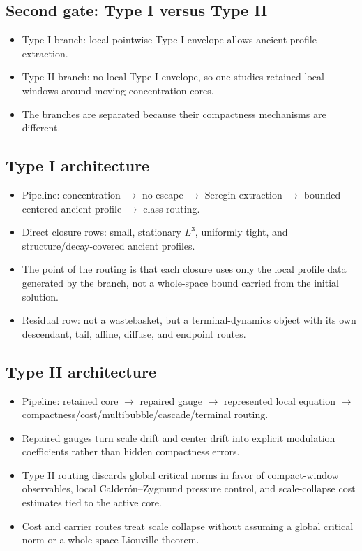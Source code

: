 \documentclass[11pt]{article}
\theoremstyle{plain}
\theoremstyle{definition}
\theoremstyle{remark}
\begin{document}
\subsection{Second gate: Type I versus Type II}
\begin{itemize}
  \item Type I branch: local pointwise Type I envelope allows ancient-profile extraction.
  \item Type II branch: no local Type I envelope, so one studies retained local windows around moving concentration cores.
  \item The branches are separated because their compactness mechanisms are different.
\end{itemize}

\subsection{Type I architecture}
\begin{itemize}
  \item Pipeline: concentration $\to$ no-escape $\to$ Seregin extraction $\to$ bounded centered ancient profile $\to$ class routing.
  \item Direct closure rows: small, stationary $L^3$, uniformly tight, and structure/decay-covered ancient profiles.
  \item The point of the routing is that each closure uses only the local profile data generated by the branch, not a whole-space bound carried from the initial solution.
  \item Residual row: not a wastebasket, but a terminal-dynamics object with its own descendant, tail, affine, diffuse, and endpoint routes.
\end{itemize}

\subsection{Type II architecture}
\begin{itemize}
  \item Pipeline: retained core $\to$ repaired gauge $\to$ represented local equation $\to$ compactness/cost/multibubble/cascade/terminal routing.
  \item Repaired gauges turn scale drift and center drift into explicit modulation coefficients rather than hidden compactness errors.
  \item Type II routing discards global critical norms in favor of compact-window observables, local Calder\'on--Zygmund pressure control, and scale-collapse cost estimates tied to the active core.
  \item Cost and carrier routes treat scale collapse without assuming a global critical norm or a whole-space Liouville theorem.
\end{itemize}
\end{document}
